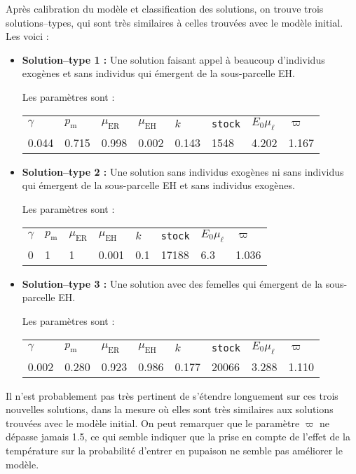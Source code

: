 Après calibration du modèle et classification des solutions, on trouve trois solutions--types, qui sont très similaires à celles trouvées avec le modèle initial.
Les voici :
\begin{itemize}
 \item \textbf{Solution--type 1 :} 
 Une solution faisant appel à beaucoup d'individus exogènes et sans individus qui émergent de la sous-parcelle EH.
 
 Les paramètres sont :
 \begin{center}
\begin{tabular}{llllllll}
$\gamma$ & $p_{\text{m}}$ & $\mu_{\text{ER}}$ & $\mu_{\text{EH}}$ & $k$ & \texttt{stock} & $E_0\mu_{\ell}$ & $\varpi$\\
0.044 & 0.715 & 0.998 & 0.002 & 0.143 & 1548 & 4.202 & 1.167
 \end{tabular}
 \end{center}

\item \textbf{Solution--type 2 :} 
Une solution sans individus exogènes ni sans individus qui émergent de la sous-parcelle EH  et sans individus exogènes.

Les paramètres sont :
 \begin{center}
\begin{tabular}{llllllll}
$\gamma$ & $p_{\text{m}}$ & $\mu_{\text{ER}}$ & $\mu_{\text{EH}}$ & $k$ & \texttt{stock} & $E_0\mu_{\ell}$ & $\varpi$\\
0 & 1 & 1 & 0.001 & 0.1 & 17188 & 6.3 & 1.036
 \end{tabular}
 \end{center}
 
\item \textbf{Solution--type 3 :}
Une solution avec des femelles qui émergent de la sous-parcelle EH.

Les paramètres sont :
 \begin{center}
\begin{tabular}{llllllll}
$\gamma$ & $p_{\text{m}}$ & $\mu_{\text{ER}}$ & $\mu_{\text{EH}}$ & $k$ & \texttt{stock} & $E_0\mu_{\ell}$ & $\varpi$\\
0.002 & 0.280 & 0.923 & 0.986 & 0.177 & 20066 & 3.288 & 1.110
 \end{tabular}
 \end{center}
\end{itemize}

Il n'est probablement pas très pertinent de s'étendre longuement sur ces trois nouvelles solutions, dans la mesure où elles sont très similaires aux solutions trouvées avec le modèle initial.
On peut remarquer que le paramètre $\varpi$ ne dépasse jamais 1.5, ce qui semble indiquer que la prise en compte de l'effet de la température sur la probabilité d'entrer en pupaison ne semble pas améliorer le modèle.

